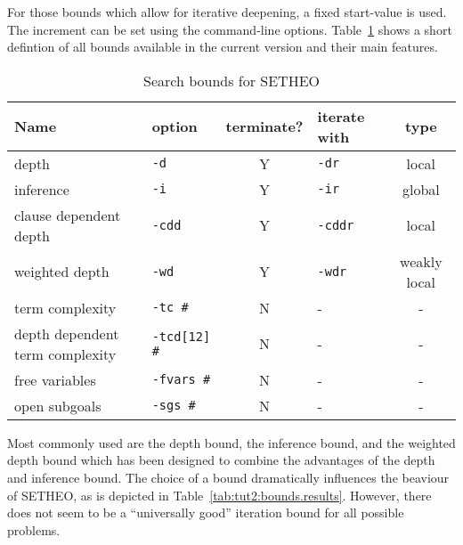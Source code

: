 For those bounds which allow for iterative deepening, a fixed start-value
is used. The increment can be set using the command-line options.
Table~\ref{tab:tut2:bounds:list} shows a short defintion of all bounds
available in the current version and their main features.

\begin{table}[htb]
\begin{center}
\small
\begin{tabular}{|l|l|c|l|c|}
\hline
Name & option & terminate? & iterate with & type \\
\hline\hline
depth & {\tt -d} & Y & {\tt -dr} & local \\
inference & {\tt -i} & Y & {\tt -ir} & global \\
clause dependent depth & {\tt -cdd} & Y & {\tt -cddr} & local \\
weighted depth & {\tt -wd} & Y & {\tt -wdr} & weakly local \\
\hline
term complexity & {\tt -tc \#} & N & - & - \\
depth dependent term complexity & {\tt -tcd[12] \#} & N & - & - \\
free variables & {\tt -fvars \#} & N & - & - \\
open subgoals & {\tt -sgs \#} & N & - & - \\
\hline
\end{tabular}
\end{center}
\caption{Search bounds for SETHEO}
\label{tab:tut2:bounds:list}
\end{table}

Most commonly used are the depth bound, the inference bound, and the
weighted depth bound which has been designed to combine the advantages
of the depth and inference bound. The choice of a bound dramatically
influences the beaviour of SETHEO, as is depicted in
Table~\ref{tab:tut2:bounds.results}. However, there does not seem
to be a ``universally good'' iteration bound for all possible problems.


